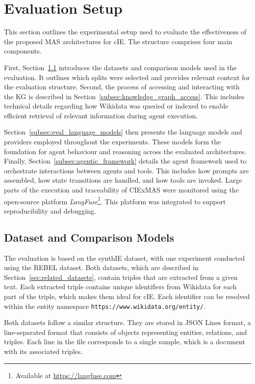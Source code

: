 \documentclass[a4paper,oneside,bibliography=totoc]{scrbook}
\begin{document}
\section{Evaluation Setup}
\label{sec:evaluation_setup}

This section outlines the experimental setup used to evaluate the effectiveness of the proposed \ac{MAS} architectures for \ac{cIE}. The structure comprises four main components.

First, Section~\ref{subsec:dataset} introduces the datasets and comparison models used in the evaluation. It outlines which splits were selected and provides relevant context for the evaluation structure. Second, the process of accessing and interacting with the \ac{KG} is described in Section~\ref{subsec:knowledge_graph_access}. This includes technical details regarding how Wikidata was queried or indexed to enable efficient retrieval of relevant information during agent execution.

Section~\ref{subsec:eval_language_models} then presents the language models and providers employed throughout the experiments. These models form the foundation for agent behaviour and reasoning across the evaluated architectures. Finally, Section~\ref{subsec:agentic_framework} details the agent framework used to orchestrate interactions between agents and tools. This includes how prompts are assembled, how state transitions are handled, and how tools are invoked. Large parts of the execution and traceability of CIExMAS were monitored using the open-source platform \textit{LangFuse}\footnote{Available at \url{https://langfuse.com}}. This platform was integrated to support reproducibility and debugging.

\subsection{Dataset and Comparison Models}
\label{subsec:dataset}

The evaluation is based on the synthIE dataset, with one experiment conducted using the REBEL dataset. Both datasets, which are described in Section~\ref{sec:related_datasets}, contain triples that are extracted from a given text. Each extracted triple contains unique identifiers from Wikidata for each part of the triple, which makes them ideal for \ac{cIE}. Each identifier can be resolved within the entity namespace \texttt{https://www.wikidata.org/entity/}.

Both datasets follow a similar structure. They are stored in JSON Lines format, a line-separated format that consists of objects representing entities, relations, and triples. Each line in the file corresponds to a single sample, which is a document with its associated triples.
\end{document}
